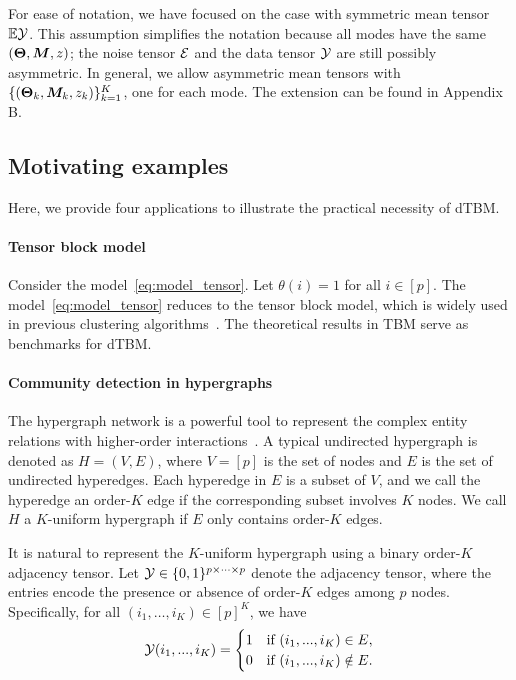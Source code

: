 \documentclass[journal]{IEEEtran}
\theoremstyle{definition}
\theoremstyle{definition}
\begin{document}
For ease of notation, we have focused on the case with symmetric mean tensor $\mathbb{E} \mathcal{Y}$. This assumption simplifies the notation because all modes have the same $(\boldsymbol{\Theta}, \bm M, z)$; the noise tensor $\mathcal{E}$ and the data tensor $\mathcal{Y}$ are still possibly asymmetric. In general, we allow asymmetric mean tensors with $\{(\boldsymbol{\Theta}_k, \bm M_k, z_k)\}_{k=1}^K$, one for each mode. The extension can be found in Appendix B.

\subsection{Motivating examples}\label{subsec:motiv} Here, we provide four applications to illustrate the practical necessity of dTBM.

\paragraph{Tensor block model} Consider the model~\eqref{eq:model_tensor}. Let $\theta(i)=1$ for all $ i \in [p]$. The model~\eqref{eq:model_tensor} reduces to the tensor block model, which is widely used in previous clustering algorithms~\citep{wang2019multiway,chi2020provable,han2020exact}. The theoretical results in TBM serve as benchmarks for dTBM.  

\paragraph{Community detection in hypergraphs} The hypergraph network is a powerful tool to represent the complex entity relations with higher-order interactions~\citep{ke2019community}. A typical undirected hypergraph is denoted as $H = (V,E)$, where $V = [p]$ is the set of nodes and $E$ is the set of undirected hyperedges. Each hyperedge in $E$ is a subset of $V$, and we call the hyperedge an order-$K$ edge if the corresponding subset involves $K$ nodes. We call $H$ a $K$-uniform hypergraph if $E$ only contains order-$K$ edges. 

It is natural to represent the $K$-uniform hypergraph using a binary order-$K$ adjacency tensor. Let $\mathcal{Y} \in \{0,1\}^{p \times \cdots \times p}$ denote the adjacency tensor, where the entries encode the presence or absence of order-$K$ edges among $p$ nodes. Specifically, for all $(i_1,\ldots,i_K) \in [p]^K$, we have
\begin{equation}
    \mathcal{Y}(i_1,...,i_K) =  \begin{cases}
    1  & \text{if }  (i_1,...,i_K) \in E,\\
    0 & \text{if }  (i_1,...,i_K) \notin E.
    \end{cases}
\end{equation}
\end{document}
